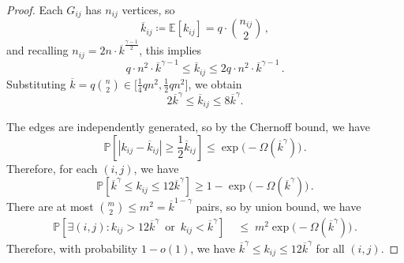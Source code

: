 \documentclass[10pt,a4paper]{amsart}
\newcommand{\PP}{\mathbb{P}}
\newcommand{\kb}{\overline{k}}
\begin{document}
\begin{proof}
	Each $G_{ij}$ has $n_{ij}$ vertices, so
	\[
	\kb_{ij} \coloneqq \mathbb{E}[k_{ij}] = q \cdot \binom{n_{ij}}{2} \, ,
	\]
	and recalling $n_{ij} =2n \cdot \kb^{\frac{\gamma-1}{2}}$, this implies
	\[ 
	  q \cdot n^2 \cdot \kb^{\gamma-1}  \leq  \kb_{ij} \leq 2q \cdot n^2 \cdot \kb^{\gamma-1} \, .
	\]
	Substituting $ \kb = q \binom{n}{2} \in \big[\frac{1}{4}qn^2,\frac{1}{2}qn^2 \big]$, we obtain
	\begin{equation}
	   2\kb^{\gamma} \leq \kb_{ij} \leq 8\kb^{\gamma}. \label{eq:k_ij_bounds}
	\end{equation}
    
	The edges are independently generated, so by the Chernoff bound, we have
	\[
	\PP\left[ |k_{ij} - \kb_{ij}| \geq  \frac{1}{2} \kb_{ij} \right]
	\leq \exp \big( - \Omega(\kb^{\gamma}) \big)  \, .
	\]
	Therefore, for each $(i,j)$, we have
    \begin{equation}
       \label{eq:bound_edge_component}
       \PP[\kb^{\gamma} \leq k_{ij} \leq 12\kb^{\gamma}] \geq 1- \exp\big( -\Omega(\kb^{\gamma})\big) \,.
    \end{equation}
	There are at most $ \binom{m}{2} \leq m^2 =  \kb^{1-\gamma}$ pairs, so by union bound, we have 
    \begin{align*}
    \PP\left[ \exists (i,j): k_{ij} > 12\kb^{\gamma} 
       \,\text{ or }\, k_{ij}< \kb^{\gamma} \right] 
    &\;\le\; m^2 \exp\big(-\Omega(\kb^{\gamma})\big) \,.
\end{align*}
	Therefore, with probability $1 - o(1)$, we have $\kb^{\gamma} \leq k_{ij} \leq 12\kb^{\gamma}$ for all $(i,j)$.
\end{proof}
\end{document}
